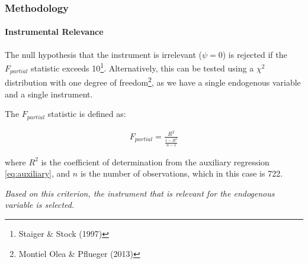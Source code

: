 
\begin{frame}
    \frametitle{Methodology}
    \framesubtitle{Instrumental Relevance}
    
    The null hypothesis that the instrument is irrelevant ($\psi = 0$) is rejected if the $F_{partial}$ statistic exceeds 10\footnote{Staiger \& Stock (1997)}. Alternatively, this can be tested using a $\chi^2$ distribution with one degree of freedom\footnote{Montiel Olea \& Pflueger (2013)}, as we have a single endogenous variable and a single instrument.
    
    The $F_{partial}$ statistic is defined as:
    
    \begin{align}
        F_{partial} = \frac{R^2}{\frac{1-R^2}{n - 1}}
    \end{align}
    
    where $R^2$ is the coefficient of determination from the auxiliary regression \ref{eq:auxiliary}, and $n$ is the number of observations, which in this case is 722.

    \emph{Based on this criterion, the instrument that is relevant for the endogenous variable is selected.}

\end{frame}
